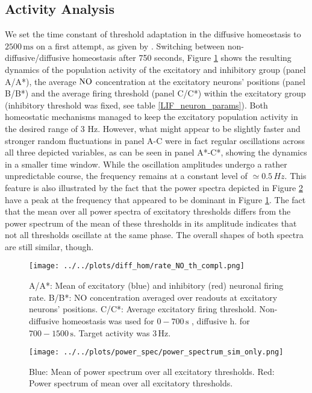\documentclass[10pt,a4paper]{article}
\begin{document}
\subsection{Activity Analysis} \label{activ_analys}
We set the time constant of threshold adaptation in the diffusive homeostasis to $\mathrm{2500\, ms}$ on a first attempt, as given by \cite{Sweeney_Paper}. Switching between non-diffusive/diffusive homeostasis after 750 seconds, Figure \ref{full_sim_osci} shows the resulting dynamics of the population activity of the excitatory and inhibitory group (panel A/A*), the average $\rm NO$ concentration at the excitatory neurons' positions (panel B/B*) and the average firing threshold (panel C/C*) within the excitatory group (inhibitory threshold was fixed, see table \ref{LIF_neuron_params}). Both homeostatic mechanisms managed to keep the excitatory population activity in the desired range of 3 Hz. However, what might appear to be slightly faster and stronger random fluctuations in panel A-C were in fact regular oscillations across all three depicted variables, as can be seen in panel A*-C*, showing the dynamics in a smaller time window. While the oscillation amplitudes undergo a rather unpredictable course, the frequency remains at a constant level of $\simeq 0.5\, Hz$. This feature is also illustrated by the fact that the power spectra depicted in Figure \ref{Power_Spec_without_Analysis} have a peak at the frequency that appeared to be dominant in Figure \ref{full_sim_osci}. The fact that the mean over all power spectra of excitatory thresholds differs from the power spectrum of the mean of these thresholds in its amplitude indicates that not all thresholds oscillate at the same phase. The overall shapes of both spectra are still similar, though.
\begin{figure}
\begin{center}
\texttt{[image: ../../plots/diff\_hom/rate\_NO\_th\_compl.png]}
\end{center}
\caption{A/A*: Mean of excitatory (blue) and inhibitory (red) neuronal firing rate. B/B*: NO concentration averaged over readouts at excitatory neurons' positions. C/C*: Average excitatory firing threshold. Non-diffusive homeostasis was used for $\mathrm{0-700\, s}$ , diffusive h. for $\mathrm{700-1500\, s}$. Target activity was $\mathrm{3\, Hz}$.}
\label{full_sim_osci}
\end{figure}
\begin{figure}
\begin{center}
\texttt{[image: ../../plots/power\_spec/power\_spectrum\_sim\_only.png]}
\caption{Blue: Mean of power spectrum over all excitatory thresholds. Red: Power spectrum of mean over all excitatory thresholds.}
\label{Power_Spec_without_Analysis}
\end{center}
\end{figure}
\end{document}
